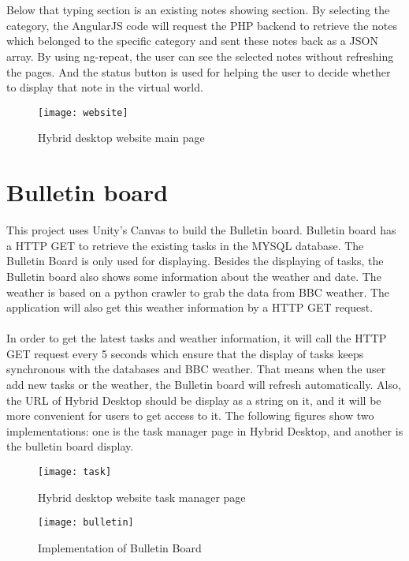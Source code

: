 \\
\\
Below that typing section is an existing notes showing section. By selecting the category, the AngularJS code will request the PHP backend to retrieve the notes which belonged to the specific category and sent these notes back as a JSON array. By using ng-repeat, the user can see the selected notes without refreshing the pages. And the status button is used for helping the user to decide whether to display that note in the virtual world.
\\
\begin{figure}[h]
    \centering
    \texttt{[image: website]}
    \caption{Hybrid desktop website main page}
    \label{fig:mesh1}
\end{figure}

\section{Bulletin board}
This project uses Unity’s Canvas to build the Bulletin board. Bulletin board has a HTTP GET to retrieve the existing tasks in the MYSQL database. The Bulletin Board is only used for displaying. Besides the displaying of tasks, the Bulletin board also shows some information about the weather and date. The weather is based on a python crawler to grab the data from BBC weather. The application will also get this weather information by a HTTP GET request. 
\\
\\
In order to get the latest tasks and weather information, it will call the HTTP GET request every 5 seconds which ensure that the display of tasks keeps synchronous with the databases and BBC weather. That means when the user add new tasks or the weather, the Bulletin board will refresh automatically. Also, the URL of Hybrid Desktop should be display as a string on it, and it will be more convenient for users to get access to it. The following figures show two implementations: one is the task manager page in Hybrid Desktop, and another is the bulletin board display. 
\begin{figure}[h]
    \centering
    \texttt{[image: task]}
    \caption{Hybrid desktop website task manager page}
    \label{fig:mesh1}
\end{figure}
\begin{figure}[h]
    \centering
    \texttt{[image: bulletin]}
    \caption{Implementation of Bulletin Board}
    \label{fig:mesh1}
\end{figure}

